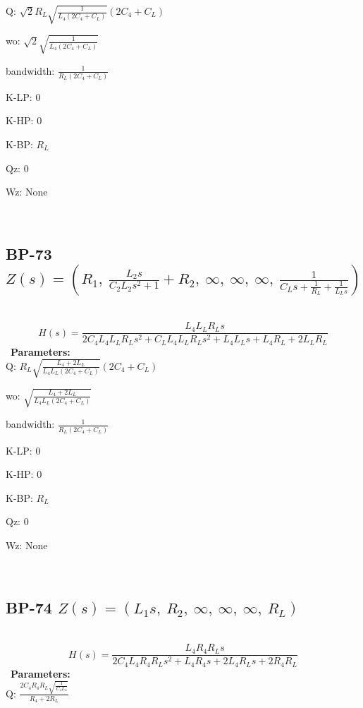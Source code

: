 \documentclass{article}
\begin{document}
Q: $\sqrt{2} R_{L} \sqrt{\frac{1}{L_{4} \left(2 C_{4} + C_{L}\right)}} \left(2 C_{4} + C_{L}\right)$\ 

wo: $\sqrt{2} \sqrt{\frac{1}{L_{4} \left(2 C_{4} + C_{L}\right)}}$\ 

bandwidth: $\frac{1}{R_{L} \left(2 C_{4} + C_{L}\right)}$\ 

K-LP: $0$\ 

K-HP: $0$\ 

K-BP: $R_{L}$\ 

Qz: $0$\ 

Wz: $\text{None}$\ 

\ 

\subsection{BP-73 $Z(s) = \left( R_{1}, \  \frac{L_{2} s}{C_{2} L_{2} s^{2} + 1} + R_{2}, \  \infty, \  \infty, \  \infty, \  \frac{1}{C_{L} s + \frac{1}{R_{L}} + \frac{1}{L_{L} s}}\right)$ } \ 
\textbf{\[H(s) = \frac{L_{4} L_{L} R_{L} s}{2 C_{4} L_{4} L_{L} R_{L} s^{2} + C_{L} L_{4} L_{L} R_{L} s^{2} + L_{4} L_{L} s + L_{4} R_{L} + 2 L_{L} R_{L}}\] } \ 
\textbf{Parameters:}\\ 

Q: $R_{L} \sqrt{\frac{L_{4} + 2 L_{L}}{L_{4} L_{L} \left(2 C_{4} + C_{L}\right)}} \left(2 C_{4} + C_{L}\right)$\ 

wo: $\sqrt{\frac{L_{4} + 2 L_{L}}{L_{4} L_{L} \left(2 C_{4} + C_{L}\right)}}$\ 

bandwidth: $\frac{1}{R_{L} \left(2 C_{4} + C_{L}\right)}$\ 

K-LP: $0$\ 

K-HP: $0$\ 

K-BP: $R_{L}$\ 

Qz: $0$\ 

Wz: $\text{None}$\ 

\ 

\subsection{BP-74 $Z(s) = \left( L_{1} s, \  R_{2}, \  \infty, \  \infty, \  \infty, \  R_{L}\right)$ } \ 
\textbf{\[H(s) = \frac{L_{4} R_{4} R_{L} s}{2 C_{4} L_{4} R_{4} R_{L} s^{2} + L_{4} R_{4} s + 2 L_{4} R_{L} s + 2 R_{4} R_{L}}\] } \ 
\textbf{Parameters:}\\ 

Q: $\frac{2 C_{4} R_{4} R_{L} \sqrt{\frac{1}{C_{4} L_{4}}}}{R_{4} + 2 R_{L}}$\ 
\end{document}
